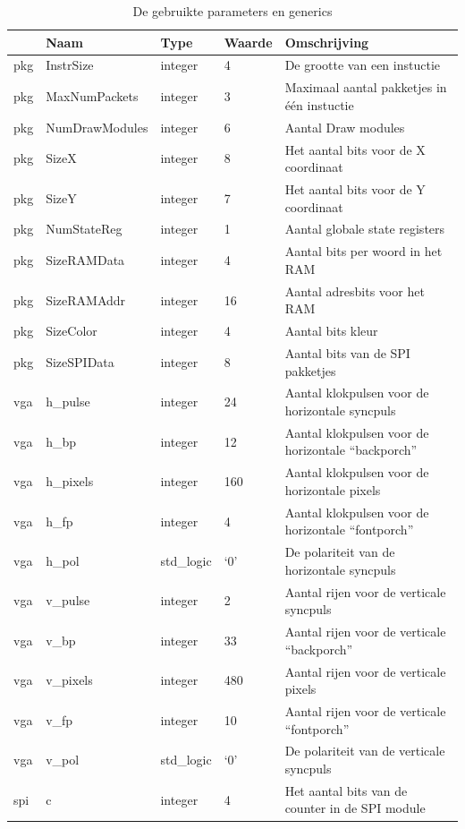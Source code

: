 \documentclass{scrreprt} %
\begin{document}
\begin{table}[H]
\centering
\caption{De gebruikte parameters en generics}
\label{tab:spec-params}
\begin{tabular}{l l l l l}
	\hline\hline
 	 & Naam & Type & Waarde & Omschrijving\\
 	\hline
	pkg & InstrSize & integer & 4 & De grootte van een instuctie\\ 
	pkg & MaxNumPackets & integer & 3 & Maximaal aantal pakketjes in één instuctie\\ 
	pkg & NumDrawModules & integer & 6 & Aantal Draw modules\\ 
	pkg & SizeX & integer & 8 & Het aantal bits voor de X coordinaat\\
	pkg & SizeY & integer & 7 & Het aantal bits voor de Y coordinaat\\
	pkg & NumStateReg & integer & 1 & Aantal globale state registers\\
	pkg & SizeRAMData & integer & 4 & Aantal bits per woord in het RAM\\
	pkg & SizeRAMAddr & integer & 16 & Aantal adresbits voor het RAM\\
	pkg & SizeColor & integer & 4 & Aantal bits kleur\\
	pkg & SizeSPIData & integer & 8 & Aantal bits van de SPI pakketjes\\
	vga & h\_pulse & integer & 24 & Aantal klokpulsen voor de horizontale syncpuls\\ 
	vga & h\_bp & integer & 12 & Aantal klokpulsen voor de horizontale “backporch” \\ 
	vga & h\_pixels & integer & 160 & Aantal klokpulsen voor de horizontale pixels \\ 
	vga & h\_fp & integer & 4 & Aantal klokpulsen voor de horizontale “fontporch” \\ 
	vga & h\_pol & std\_logic & ‘0’ & De polariteit van de horizontale syncpuls\\ 
	vga & v\_pulse & integer & 2 & Aantal rijen voor de verticale syncpuls\\ 
	vga & v\_bp & integer & 33 & Aantal rijen voor de verticale “backporch” \\ 
	vga & v\_pixels & integer & 480 & Aantal rijen voor de verticale pixels\\ 
	vga & v\_fp & integer & 10 & Aantal rijen voor de verticale “fontporch” \\ 
	vga & v\_pol & std\_logic & ‘0’ & De polariteit van de verticale syncpuls\\ 
	spi & c & integer & 4 & Het aantal bits van de counter in de SPI module\\
  	\hline
\end{tabular}
\end{table}
\end{document}
